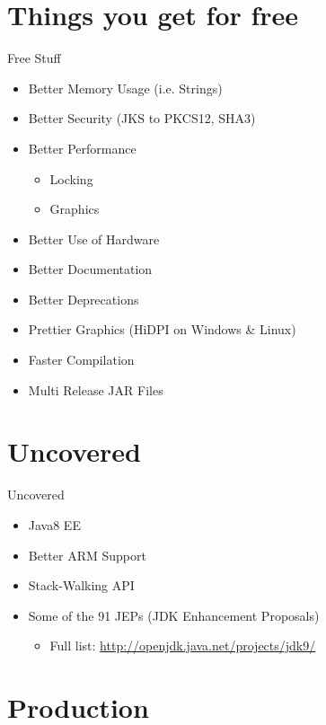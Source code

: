 \section{Things you get for free}

\begin{frame}{Free Stuff}
	\begin{itemize}
		\item Better Memory Usage (i.e. Strings)
		\item Better Security (JKS to PKCS12, SHA3)
		\item Better Performance
		\begin{itemize}
			\item Locking
			\item Graphics
		\end{itemize}
		\item Better Use of Hardware
		\item Better Documentation
		\item Better Deprecations
		\item Prettier Graphics (HiDPI on Windows \& Linux)
		\item Faster Compilation
		\item Multi Release JAR Files
	\end{itemize}
\end{frame}

\section{Uncovered}

\begin{frame}{Uncovered}
	\begin{itemize}
		\item Java8 EE
		\item Better ARM Support
		\item Stack-Walking API
		\item Some of the 91 JEPs (JDK Enhancement Proposals)
		\begin{itemize}
			\item Full list: \url{http://openjdk.java.net/projects/jdk9/}
		\end{itemize}
	\end{itemize}
\end{frame}


\section{Production}

